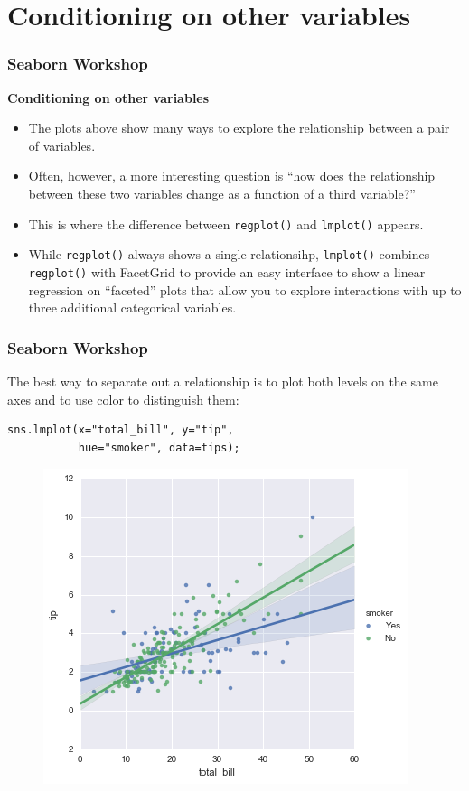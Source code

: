 \documentclass{beamer}
\begin{document}
\section{Conditioning on other variables}
\begin{frame}
	\frametitle{Seaborn Workshop}
	\large
\textbf{Conditioning on other variables}
	\begin{itemize}
\item The plots above show many ways to explore the relationship between a pair of variables.
\item Often, however, a more interesting question is “how does the relationship between these two variables change as a function of a third variable?” 
\item This is where the difference between \texttt{regplot()} and \texttt{lmplot()} appears. 
\item While \texttt{regplot()} always shows a single relationsihp, \texttt{lmplot()} combines \texttt{regplot()} with FacetGrid to provide an easy interface to show a linear regression on “faceted” plots that allow you to explore interactions with up to three additional categorical variables.
	\end{itemize}

\end{frame}
\begin{frame}[fragile]
	\frametitle{Seaborn Workshop}
\large

The best way to separate out a relationship is to plot both levels on the same axes and to use color to distinguish them:
\begin{verbatim}
sns.lmplot(x="total_bill", y="tip", 
           hue="smoker", data=tips);
\end{verbatim}

\begin{figure}
	\centering
	\includegraphics[width=0.55\linewidth]{images/regression_39_0}
\end{figure}
\end{frame}
\end{document}
